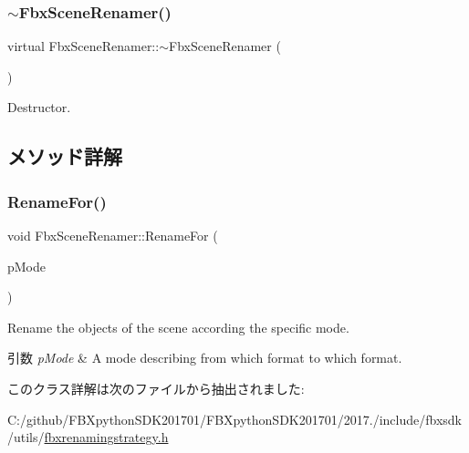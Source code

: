\subsubsection{\texorpdfstring{$\sim$\+Fbx\+Scene\+Renamer()}{~FbxSceneRenamer()}}
{\footnotesize\ttfamily virtual Fbx\+Scene\+Renamer\+::$\sim$\+Fbx\+Scene\+Renamer (\begin{DoxyParamCaption}{ }\end{DoxyParamCaption})\hspace{0.3cm}{\ttfamily [virtual]}}



Destructor. 



\subsection{メソッド詳解}
\mbox{\label{class_fbx_scene_renamer_a08a9c3b587efe5422bd5b79f01b42e6d}} 
\subsubsection{\texorpdfstring{Rename\+For()}{RenameFor()}}
{\footnotesize\ttfamily void Fbx\+Scene\+Renamer\+::\+Rename\+For (\begin{DoxyParamCaption}\item[{\hyperlink{class_fbx_scene_renamer_a9279ee1a645d6499b934adbc376f8678}{E\+Renaming\+Mode}}]{p\+Mode }\end{DoxyParamCaption})}

Rename the objects of the scene according the specific mode. 
\begin{DoxyParams}{引数}
{\em p\+Mode} & A mode describing from which format to which format. \\
\hline
\end{DoxyParams}


このクラス詳解は次のファイルから抽出されました\+:\begin{DoxyCompactItemize}
\item 
C\+:/github/\+F\+B\+Xpython\+S\+D\+K201701/\+F\+B\+Xpython\+S\+D\+K201701/2017./include/fbxsdk/utils/\hyperlink{fbxrenamingstrategy_8h}{fbxrenamingstrategy.\+h}\end{DoxyCompactItemize}
